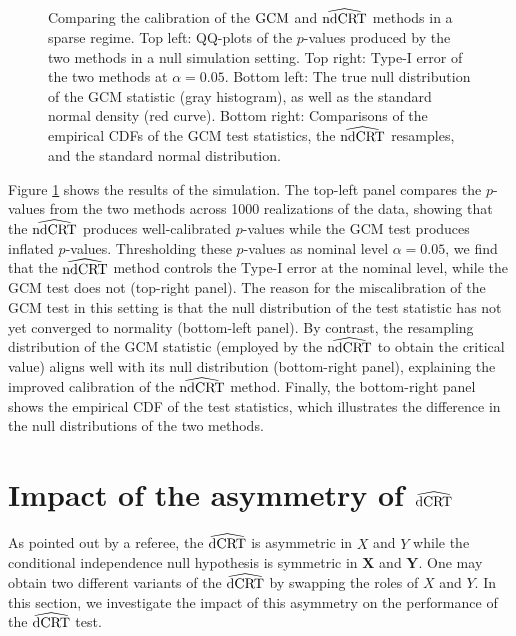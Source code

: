 \documentclass[aos]{imsart}
\theoremstyle{definition}
\theoremstyle{remark}
\newcommand{\prx}{\bm X}								%
\newcommand{\srx}{X}									%
\newcommand{\pry}{{\bm Y}}								%
\newcommand{\sry}{Y}									%
\newcommand{\GCM}{\textnormal{GCM}}						%
\newcommand{\dCRThat}{\widehat{\textnormal{dCRT}}}		%
\newcommand{\ndCRThat}{\widehat{\textnormal{ndCRT}}}	%
\begin{document}
\begin{figure}
\begin{subfigure}[b]{0.49\textwidth}
		\end{subfigure}
		\caption{Comparing the calibration of the $\GCM$ and $\ndCRThat$ methods in a sparse regime. Top left: QQ-plots of the $p$-values produced by the two methods in a null simulation setting. Top right: Type-I error of the two methods at $\alpha = 0.05$. Bottom left: The true null distribution of the GCM statistic (gray histogram), as well as the standard normal density (red curve). Bottom right: Comparisons of the empirical CDFs of the GCM test statistics, the $\ndCRThat$ resamples, and the standard normal distribution.}
		\label{fig:dCRT_GCM_binomial_poisson} 
	\end{figure}

    Figure \ref{fig:dCRT_GCM_binomial_poisson} shows the results of the simulation. The top-left panel compares the $p$-values from the two methods across 1000 realizations of the data, showing that the $\ndCRThat$ produces well-calibrated $p$-values while the GCM test produces inflated $p$-values. Thresholding these $p$-values as nominal level $\alpha = 0.05$, we find that the $\ndCRThat$ method controls the Type-I error at the nominal level, while the GCM test does not (top-right panel). The reason for the miscalibration of the GCM test in this setting is that the null distribution of the test statistic has not yet converged to normality (bottom-left panel). By contrast, the resampling distribution of the GCM statistic (employed by the $\ndCRThat$ to obtain the critical value) aligns well with its null distribution (bottom-right panel), explaining the improved calibration of the $\ndCRThat$ method. Finally, the bottom-right panel shows the empirical CDF of the test statistics, which illustrates the difference in the null distributions of the two methods.

	\clearpage
	\section{Impact of the asymmetry of $\dCRThat$}

	As pointed out by a referee, the $\dCRThat$ is asymmetric in $\srx$ and $\sry$ while the conditional independence null hypothesis is symmetric in $\prx$ and $\pry$. One may obtain two different variants of the $\dCRThat$ by swapping the roles of $\srx$ and $\sry$. In this section, we investigate the impact of this asymmetry on the performance of the $\dCRThat$ test. 
	
\end{document}
